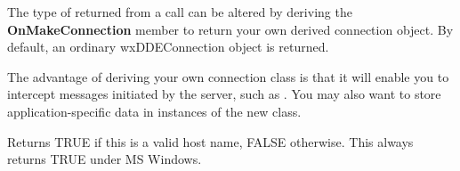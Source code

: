 
The type of  returned from a  call can
be altered by deriving the {\bf OnMakeConnection} member to return your
own derived connection object. By default, an ordinary wxDDEConnection
object is returned.

The advantage of deriving your own connection class is that it will
enable you to intercept messages initiated by the server, such
as . You may also want to
store application-specific data in instances of the new class.



Returns TRUE if this is a valid host name, FALSE otherwise. This always
returns TRUE under MS Windows.


